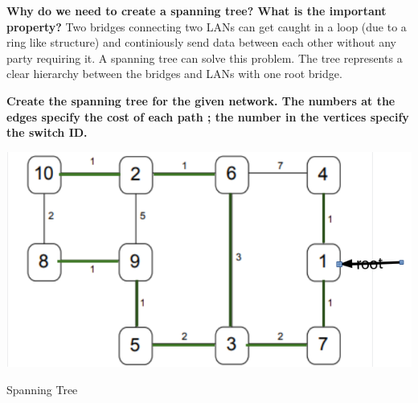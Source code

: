 \documentclass[a4paper,12pt]{article}
\begin{document}
    \textbf{Why do we need to create a spanning tree? What is the important property?} \newline
    Two bridges connecting two LANs can get caught in a loop (due to a ring like structure) and continiously send
    data between each other without any party requiring it. A spanning tree can solve this problem. The tree 
    represents a clear hierarchy between the bridges and LANs with one root bridge. \newline
    \newpage

    \textbf{Create the spanning tree for the given network. The numbers at the edges specify the cost of each path
    ; the number in the vertices specify the switch ID.} \newline

    \begin{center}%
	    \includegraphics[width=0.5\linewidth]{tree.png} 
	    \caption{Spanning Tree}
    \end{center}
    	
\end{document}
